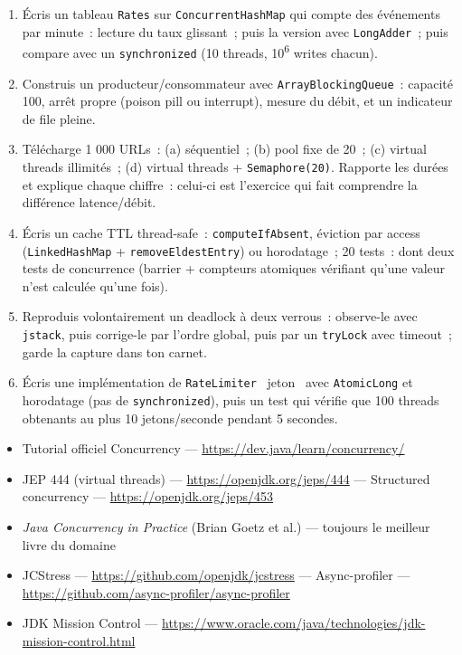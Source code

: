 \begin{exercice}
\begin{enumerate}
  \item \'Ecris un tableau \verb|Rates| sur \verb|ConcurrentHashMap| qui compte des \'ev\'enements par
        minute~: lecture du taux glissant~; puis la version avec \verb|LongAdder|~; puis compare
        avec un \verb|synchronized| (10 threads, 10\textsuperscript{6} writes chacun).
  \item Construis un producteur/consommateur avec \verb|ArrayBlockingQueue|~: capacit\'e 100,
        arr\^et propre (poison pill ou interrupt), mesure du d\'ebit, et un indicateur de file pleine.
  \item T\'el\'echarge 1 000 URLs~: (a) s\'equentiel~; (b) pool fixe de 20~; (c) virtual threads
        illimit\'es~; (d) virtual threads + \verb|Semaphore(20)|. Rapporte les dur\'ees et explique
        chaque chiffre~: celui-ci est l'exercice qui fait comprendre la diff\'erence latence/d\'ebit.
  \item \'Ecris un cache TTL thread-safe~: \verb|computeIfAbsent|, \'eviction par access
        (\verb|LinkedHashMap| + \verb|removeEldestEntry|) ou horodatage~; 20 tests~: dont deux
        tests de concurrence (barrier + compteurs atomiques v\'erifiant qu'une valeur n'est calcul\'ee
        qu'une fois).
  \item Reproduis volontairement un deadlock \`a deux verrous~: observe-le avec \verb|jstack|, puis
        corrige-le par l'ordre global, puis par un \verb|tryLock| avec timeout~; garde la capture
        dans ton carnet.
  \item \'Ecris une impl\'ementation de \verb|RateLimiter| \og ~jeton~ \fg{} avec \verb|AtomicLong| et
        horodatage (pas de \verb|synchronized|), puis un test qui v\'erifie que 100 threads
        obtenants au plus 10 jetons/seconde pendant 5 secondes.
\end{enumerate}
\end{exercice}

\begin{ressources}
\begin{itemize}
  \item Tutorial officiel Concurrency --- \url{https://dev.java/learn/concurrency/}
  \item JEP 444 (virtual threads) --- \url{https://openjdk.org/jeps/444} --- Structured concurrency --- \url{https://openjdk.org/jeps/453}
  \item \emph{Java Concurrency in Practice} (Brian Goetz et al.) --- toujours le meilleur livre du domaine
  \item JCStress --- \url{https://github.com/openjdk/jcstress} --- Async-profiler --- \url{https://github.com/async-profiler/async-profiler}
  \item JDK Mission Control --- \url{https://www.oracle.com/java/technologies/jdk-mission-control.html}
\end{itemize}
\end{ressources}

